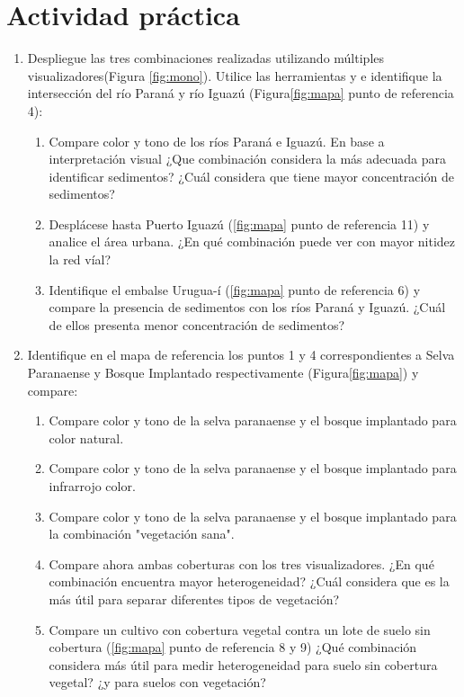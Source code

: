 \section{Actividad práctica}
\begin{enumerate}
  \item Despliegue las tres combinaciones realizadas utilizando múltiples visualizadores(Figura \ref{fig:mono}). Utilice las herramientas  y  e identifique la intersección del río Paraná y río Iguazú (Figura\ref{fig:mapa} punto de referencia 4):
  \begin{enumerate}
  \item Compare color y tono de los ríos Paraná e Iguazú. En base a interpretación visual ¿Que combinación considera la más adecuada para identificar sedimentos? ¿Cuál  considera que tiene mayor concentración de sedimentos?
  \item  Desplácese hasta Puerto Iguazú (\ref{fig:mapa} punto de referencia 11) y analice el área urbana. ¿En qué combinación puede ver con mayor nitidez la red víal?
  \item  Identifique el embalse Urugua-í (\ref{fig:mapa} punto de referencia 6) y compare la presencia de sedimentos con los ríos Paraná y Iguazú. ¿Cuál de ellos presenta menor concentración de sedimentos?
\end{enumerate}

  \item Identifique en el mapa de referencia los puntos 1 y 4 correspondientes a Selva Paranaense y Bosque Implantado respectivamente (Figura\ref{fig:mapa}) y compare:
  \begin{enumerate}
    \item  Compare color y tono de la selva paranaense y el bosque implantado para color natural.
    \item  Compare color y tono de la selva paranaense y el bosque implantado para infrarrojo color.
    \item  Compare color y tono de la selva paranaense y el bosque implantado para la combinación "vegetación sana".
    \item Compare ahora ambas coberturas con los tres visualizadores. ¿En qué combinación encuentra mayor heterogeneidad? ¿Cuál considera que es la más útil para separar diferentes tipos de vegetación?
    \item Compare un cultivo con cobertura vegetal contra un lote de suelo sin cobertura (\ref{fig:mapa} punto de referencia 8 y 9) ¿Qué combinación considera más útil para medir heterogeneidad para suelo sin cobertura vegetal? ¿y para suelos con vegetación?
  \end{enumerate}


\end{enumerate}
